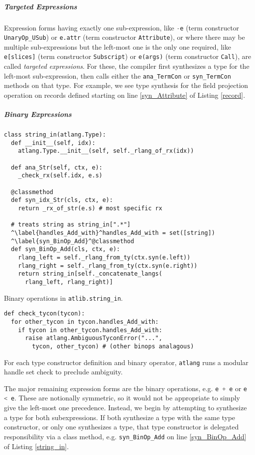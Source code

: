 \documentclass[9pt]{sigplanconf}
\newcommand{\lstinlinep}[1]{\lstinline[language=Python,basicstyle=\ttfamily\small,deletendkeywords={tuple,buffer,map}]{#1}}
\begin{document}
\subparagraph{Targeted Expressions} Expression forms having exactly one sub-expression, like \lstinlinep{-e} (term constructor \lstinlinep{UnaryOp_USub}) or \lstinlinep{e.attr} (term constructor \lstinlinep{Attribute}), or where there may be multiple sub-expressions but the left-most one is the only one required, like \lstinlinep{e[slices]} (term constructor  \lstinlinep{Subscript}) or \lstinlinep{e(args)} (term constructor \lstinlinep{Call}), are called \emph{targeted expressions}. For these, the compiler first synthesizes a type for the left-most sub-expression, then calls either the \lstinlinep{ana_TermCon} or \lstinlinep{syn_TermCon} methods on that type. For example, we see type synthesis for the field projection operation on records defined starting on line \ref{syn_Attribute} of Listing \ref{record}.%

\subparagraph{Binary Expressions} \begin{codelisting}[t]
\begin{lstlisting}
class string_in(atlang.Type):
  def __init__(self, idx):
    atlang.Type.__init__(self, self._rlang_of_rx(idx))

  def ana_Str(self, ctx, e):
    _check_rx(self.idx, e.s)

  @classmethod
  def syn_idx_Str(cls, ctx, e):
    return _rx_of_str(e.s) # most specific rx

  # treats string as string_in[".*"]
  ^\label{handles_Add_with}^handles_Add_with = set([string]) 
  ^\label{syn_BinOp_Add}^@classmethod
  def syn_BinOp_Add(cls, ctx, e): 
    rlang_left = self._rlang_from_ty(ctx.syn(e.left)) 
    rlang_right = self._rlang_from_ty(ctx.syn(e.right))
    return string_in[self._concatenate_langs(
      rlang_left, rlang_right)]
\end{lstlisting}
\caption{Binary operations in \texttt{atlib.string\_in}.}
\label{string_in}
\end{codelisting}
\begin{codelisting}[t]
\begin{lstlisting}
def check_tycon(tycon):
  for other_tycon in tycon.handles_Add_with: 
    if tycon in other_tycon.handles_Add_with:
      raise atlang.AmbiguousTyconError("...", 
        tycon, other_tycon) # (other binops analagous)
\end{lstlisting}
\caption{For each type constructor definition and binary operator, \texttt{atlang} runs a modular handle set check to preclude ambiguity.}
\label{check_tycon}
\end{codelisting}
The major remaining expression forms are the binary operations, e.g. \lstinlinep{e + e} or \lstinlinep{e < e}. These are notionally symmetric, so it would not be appropriate to simply give the left-most one precedence. Instead, we begin by attempting to synthesize a type for both subexpressions. If both synthesize a type with the same type constructor, or only one synthesizes a type, that type constructor is delegated responsibility via a class method, e.g. \lstinlinep{syn_BinOp_Add} on line \ref{syn_BinOp_Add} of Listing \ref{string_in}. 
\end{document}
